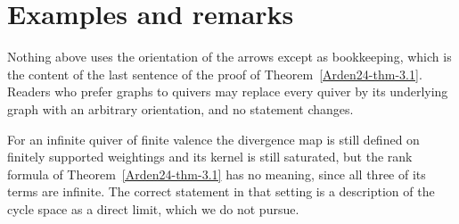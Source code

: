 \section{Examples and remarks}\label{Arden24-sec-4}

\begin{remark}\label{Arden24-rem-4.1}
\label{Arden24-rem:orientation}
Nothing above uses the orientation of the arrows except as bookkeeping, which is the content of the last sentence of the proof of Theorem~\ref{Arden24-thm-3.1}. Readers who prefer graphs to quivers may replace every quiver by its underlying graph with an arbitrary orientation, and no statement changes.
\end{remark}

\begin{remark}\label{Arden24-rem-4.2}
\label{Arden24-rem:infinite}
For an infinite quiver of finite valence the divergence map is still defined on finitely supported weightings and its kernel is still saturated, but the rank formula of Theorem~\ref{Arden24-thm-3.1} has no meaning, since all three of its terms are infinite. The correct statement in that setting is a description of the cycle space as a direct limit, which we do not pursue.
\end{remark}
